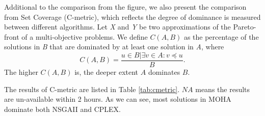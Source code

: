 Additional to the comparison from the figure, we also present the comparison from Set Coverage (C-metric), which reflects the degree of dominance is measured between different algorithms.
 Let \textit{X} and \textit{Y} be two approximations of the Pareto-front of a multi-objective problems. We define $C({A},{B})$ as the percentage of the solutions in \textit{B} that are dominated by at least one solution in \textit{A}, where
\begin{equation}
   C({A},{B})={\dfrac{u\in{B}|\exists v \in A: v \preceq u}{B}}.
\end{equation}
The higher $C({A},{B})$ is, the deeper extent $A$ dominates $B$.

The results of C-metric are listed in Table \ref{tab:cmetric}. $NA$ means the results are un-available within 2 hours.  As we can see, most solutions in MOHA dominate both NSGAII and CPLEX. 


 
